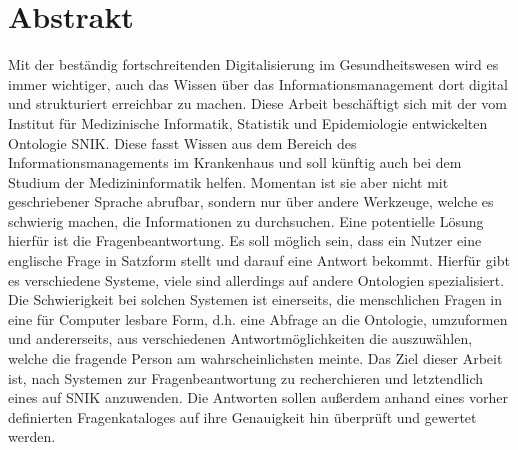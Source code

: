 \chapter*{Abstrakt}
Mit der beständig fortschreitenden Digitalisierung im Gesundheitswesen wird es immer wichtiger, auch das Wissen über das Informationsmanagement dort digital und strukturiert erreichbar zu machen.
Diese Arbeit beschäftigt sich mit der vom Institut für Medizinische Informatik, Statistik und Epidemiologie entwickelten Ontologie SNIK.
Diese fasst Wissen aus dem Bereich des Informationsmanagements im Krankenhaus und soll künftig auch bei dem Studium der Medizininformatik helfen.
Momentan ist sie aber nicht mit geschriebener Sprache abrufbar, sondern nur über andere Werkzeuge, welche es schwierig machen, die Informationen zu durchsuchen.
Eine potentielle Lösung hierfür ist die Fragenbeantwortung.
Es soll möglich sein, dass ein Nutzer eine englische Frage in Satzform stellt und darauf eine Antwort bekommt.
Hierfür gibt es verschiedene Systeme, viele sind allerdings auf andere Ontologien spezialisiert.
Die Schwierigkeit bei solchen Systemen ist einerseits, die menschlichen Fragen in eine für Computer lesbare Form, d.h. eine Abfrage an die Ontologie,
umzuformen und andererseits, aus verschiedenen Antwortmöglichkeiten die auszuwählen, welche die fragende Person am wahrscheinlichsten meinte.
Das Ziel dieser Arbeit ist, nach Systemen zur Fragenbeantwortung zu recherchieren und letztendlich eines auf SNIK anzuwenden.
Die Antworten sollen außerdem anhand eines vorher definierten Fragenkataloges auf ihre Genauigkeit hin überprüft und gewertet werden.
\vfill
